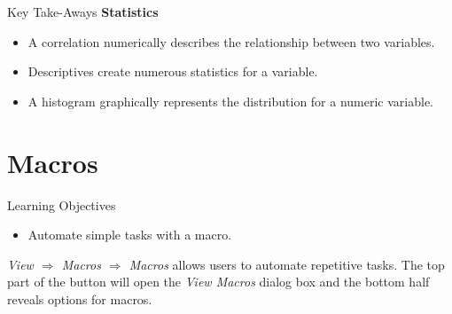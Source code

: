 \begin{center}
	\begin{tkwbox}{Key Take-Aways}
		\textbf{Statistics}
		\\
		\begin{itemize}
			\setlength{\itemsep}{0pt}
			\setlength{\parskip}{0pt}
			\setlength{\parsep}{0pt}
			
			\item A correlation numerically describes the relationship between two variables.
			\item Descriptives create numerous statistics for a variable.
			\item A histogram graphically represents the distribution for a numeric variable.
			
		\end{itemize}
	\end{tkwbox}
\end{center}

\section{Macros}

\begin{center}
	\begin{objbox}{Learning Objectives}
		\begin{itemize}
			\setlength{\itemsep}{0pt}
			\setlength{\parskip}{0pt}
			\setlength{\parsep}{0pt}
			
			\item Automate simple tasks with a macro.
			
		\end{itemize}
	\end{objbox}
\end{center}

\textit{View $ \Rightarrow $ Macros $ \Rightarrow $ Macros} allows users to automate repetitive tasks. The top part of the button will open the \textit{View Macros} dialog box and the bottom half reveals options for macros. 

